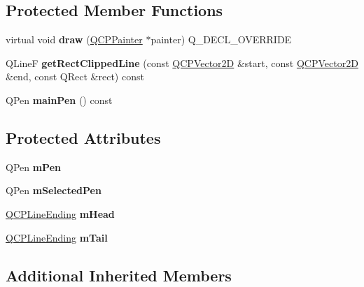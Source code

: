 \subsection*{Protected Member Functions}
\begin{DoxyCompactItemize}
\item 
\mbox{\label{classQCPItemLine_ae184140b61b2ef5b8edde76304447200}} 
virtual void {\bfseries draw} (\hyperlink{classQCPPainter}{Q\+C\+P\+Painter} $\ast$painter) Q\+\_\+\+D\+E\+C\+L\+\_\+\+O\+V\+E\+R\+R\+I\+DE
\item 
\mbox{\label{classQCPItemLine_a7b00a1d82be8b961461cc4039acd12a3}} 
Q\+LineF {\bfseries get\+Rect\+Clipped\+Line} (const \hyperlink{classQCPVector2D}{Q\+C\+P\+Vector2D} \&start, const \hyperlink{classQCPVector2D}{Q\+C\+P\+Vector2D} \&end, const Q\+Rect \&rect) const
\item 
\mbox{\label{classQCPItemLine_af8b5370462515b279578d8b4a57bd3b4}} 
Q\+Pen {\bfseries main\+Pen} () const
\end{DoxyCompactItemize}
\subsection*{Protected Attributes}
\begin{DoxyCompactItemize}
\item 
\mbox{\label{classQCPItemLine_abbb544d5bb927dfe4e81a7f3ca4c65ac}} 
Q\+Pen {\bfseries m\+Pen}
\item 
\mbox{\label{classQCPItemLine_aff858ad6dde3b90024814ca4b116f278}} 
Q\+Pen {\bfseries m\+Selected\+Pen}
\item 
\mbox{\label{classQCPItemLine_a51603f28ab7ddb1c1a95ea384791d3ed}} 
\hyperlink{classQCPLineEnding}{Q\+C\+P\+Line\+Ending} {\bfseries m\+Head}
\item 
\mbox{\label{classQCPItemLine_ab8ed61dfe15bbb1cbf9b95eae95e242f}} 
\hyperlink{classQCPLineEnding}{Q\+C\+P\+Line\+Ending} {\bfseries m\+Tail}
\end{DoxyCompactItemize}
\subsection*{Additional Inherited Members}


